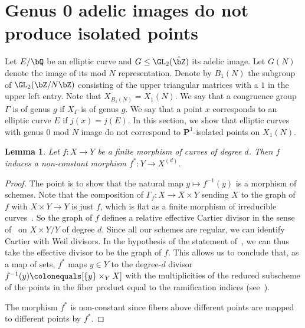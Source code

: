 \documentclass[11pt,reqno]{amsart}
\theoremstyle{plain}
\newtheorem{lemma}[theorem]{Lemma}
\theoremstyle{definition}
\newcommand{\Q}{\bQ}
\newcommand{\Z}{\bZ}
\newcommand{\PP}{\mathbf P}
\newcommand{\filip}[1]{{\textcolor{cyan}{Filip: [#1]}}}
\newcommand{\sachi}[1]{\textcolor{purple}{Sachi: #1}}
\begin{document}
\section{Genus 0 adelic images do not produce isolated points}
\label{sec:genus0images}


\label{sec:genus0}
Let $E/\Q$ be an elliptic curve and $G\leq \GL_2(\hat \Z)$ its adelic image. Let $G(N)$ denote the image of its mod $N$ representation. Denote by $B_1(N)$ the subgroup of $\GL_2(\Z/N\Z)$ consisting of the upper triangular matrices with a $1$ in the upper left entry. Note that $X_{B_1(N)}=X_1(N)$. We say that a congruence group $\Gamma$ is of genus $g$ if $X_\Gamma$ is of genus $g$. We say that a point $x$ corresponds to an elliptic curve $E$ if $j(x) = j(E)$. In this section, we show that elliptic curves with genus $0$ mod $N$ image  do not correspond to $\PP^1$-isolated points on $X_1(N)$.


\begin{lemma} \label{lem:map to Symd}
Let $f\colon X \to Y$ be a finite morphism of curves of degree $d$. Then $f$ induces a non-constant morphism $f^*\colon Y \to X^{(d)}$.
\end{lemma}
\begin{proof}
    The point is to show that the natural map $y \mapsto f^{-1}(y)$ is a morphism of schemes.  Note that the composition of $\Gamma_f\colon X \to X \times Y$ sending $X$ to the graph of $f$ with $X \times Y \to Y$ is just $f$, which is flat as a finite morphism of irreducible curves~\cite[Proposition~4.3.9]{Liu2002}. So the graph of $f$ defines a relative effective Cartier divisor in the sense of~\cite[Definition~3.4]{MilneJV} on $X \times Y/Y$ of degree $d$.
    Since all our schemes are regular, we can identify Cartier with Weil divisors. 
    In the hypothesis of the statement of~\cite[Theorem~3.13]{MilneJV}, we can thus take the effective divisor to be the graph of $f$. This allows us to conclude that, as a map of sets, $f^*$ maps $y \in Y$ to the degree-$d$ divisor $f^{-1}(y) \colonequals [\{y\} \times_Y X]$ with the multiplicities of the reduced subscheme of the points in the fiber product equal to the ramification indices (see~\cite[\S\,1.5, \S\,1.7]{FultonIntersectionTheory}).
     
    The morphism $f^*$ is non-constant since fibers above different points are mapped to different points by $f^*$.
\end{proof}


\end{document}
